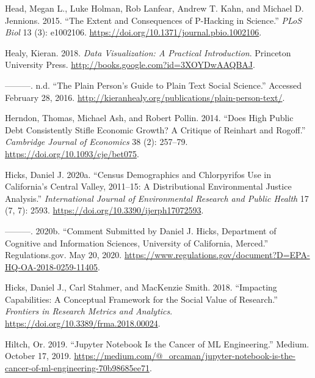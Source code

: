 \documentclass[
]{article}
\newlength{\cslhangindent}
\newenvironment{cslreferences}%
  {\setlength{\parindent}{0pt}%
  \everypar{\setlength{\hangindent}{\cslhangindent}}\ignorespaces}%
  {\par}
\begin{document}
\begin{cslreferences}
\leavevmode\hypertarget{ref-HeadExtentConsequencesPHacking2015}{}%
Head, Megan L., Luke Holman, Rob Lanfear, Andrew T. Kahn, and Michael D. Jennions. 2015. ``The Extent and Consequences of P-Hacking in Science.'' \emph{PLoS Biol} 13 (3): e1002106. \url{https://doi.org/10.1371/journal.pbio.1002106}.

\leavevmode\hypertarget{ref-HealyDataVisualizationPractical2018}{}%
Healy, Kieran. 2018. \emph{Data Visualization: A Practical Introduction}. Princeton University Press. \url{http://books.google.com?id=3XOYDwAAQBAJ}.

\leavevmode\hypertarget{ref-HealyPlainPersonGuide}{}%
---------. n.d. ``The Plain Person's Guide to Plain Text Social Science.'' Accessed February 28, 2016. \url{http://kieranhealy.org/publications/plain-person-text/}.

\leavevmode\hypertarget{ref-HerndonDoesHighPublic2014}{}%
Herndon, Thomas, Michael Ash, and Robert Pollin. 2014. ``Does High Public Debt Consistently Stifle Economic Growth? A Critique of Reinhart and Rogoff.'' \emph{Cambridge Journal of Economics} 38 (2): 257--79. \url{https://doi.org/10.1093/cje/bet075}.

\leavevmode\hypertarget{ref-HicksCensusDemographicsChlorpyrifos2020}{}%
Hicks, Daniel J. 2020a. ``Census Demographics and Chlorpyrifos Use in California's Central Valley, 2011--15: A Distributional Environmental Justice Analysis.'' \emph{International Journal of Environmental Research and Public Health} 17 (7, 7): 2593. \url{https://doi.org/10.3390/ijerph17072593}.

\leavevmode\hypertarget{ref-HicksCommentSubmittedDaniel2020}{}%
---------. 2020b. ``Comment Submitted by Daniel J. Hicks, Department of Cognitive and Information Sciences, University of California, Merced.'' Regulations.gov. May 20, 2020. \url{https://www.regulations.gov/document?D=EPA-HQ-OA-2018-0259-11405}.

\leavevmode\hypertarget{ref-HicksImpactingCapabilitiesConceptual2018}{}%
Hicks, Daniel J., Carl Stahmer, and MacKenzie Smith. 2018. ``Impacting Capabilities: A Conceptual Framework for the Social Value of Research.'' \emph{Frontiers in Research Metrics and Analytics}. \url{https://doi.org/10.3389/frma.2018.00024}.

\leavevmode\hypertarget{ref-HiltchJupyterNotebookCancer2019}{}%
Hiltch, Or. 2019. ``Jupyter Notebook Is the Cancer of ML Engineering.'' Medium. October 17, 2019. \url{https://medium.com/@_orcaman/jupyter-notebook-is-the-cancer-of-ml-engineering-70b98685ee71}.


\end{cslreferences}
\end{document}
